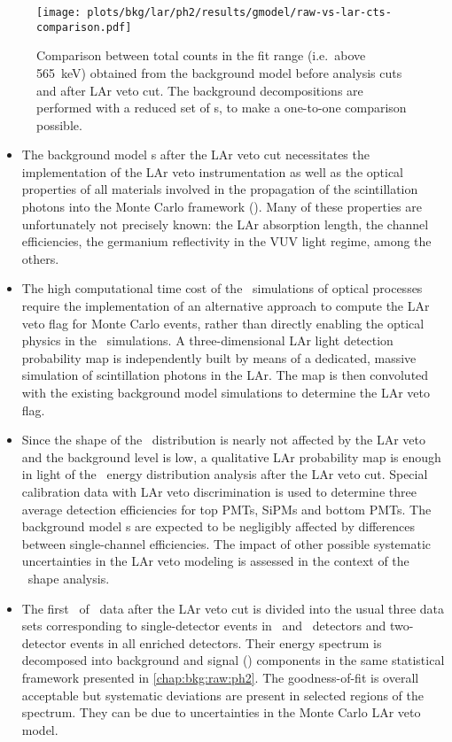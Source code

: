 \begin{figure}
  \centering
  \texttt{[image: plots/bkg/lar/ph2/results/gmodel/raw-vs-lar-cts-comparison.pdf]}
  \caption{%
    Comparison between total counts in the fit range (i.e.~above 565~keV) obtained from
    the background model before analysis cuts and after LAr veto cut. The background
    decompositions are performed with a reduced set of \pdf{}s, to make a one-to-one
    comparison possible.
  }\label{fig:bkg:lar:ph2:cts-comparison}
\end{figure}

\chapsummary
\begin{itemize}
  \item The background model \pdf{}s after the LAr veto cut necessitates the implementation
    of the LAr veto instrumentation as well as the optical properties of all materials
    involved in the propagation of the scintillation photons into the Monte Carlo
    framework (\mage). Many of these properties are unfortunately not precisely known: the
    LAr absorption length, the channel efficiencies, the germanium reflectivity in the VUV
    light regime, among the others.
  \item The high computational time cost of the \geant\ simulations of optical processes
    require the implementation of an alternative approach to compute the LAr veto flag for
    Monte Carlo events, rather than directly enabling the optical physics in the \mage\
    simulations. A three-dimensional LAr light detection probability map is independently
    built by means of a dedicated, massive simulation of scintillation photons in the LAr.
    The map is then convoluted with the existing background model simulations to determine
    the LAr veto flag.
  \item Since the shape of the \nnbb\ distribution is nearly not affected by the LAr veto
    and the background level is low, a qualitative LAr probability map is enough in light
    of the \nnbb\ energy distribution analysis after the LAr veto cut. Special calibration
    data with LAr veto discrimination is used to determine three average detection
    efficiencies for top PMTs, SiPMs and bottom PMTs. The background model \pdf{}s are
    expected to be negligibly affected by differences between single-channel efficiencies.
    The impact of other possible systematic uncertainties in the LAr veto modeling is
    assessed in the context of the \nnbb\ shape analysis.
  \item The first \gexpophasetwobkg\ of \phasetwo\ data after the LAr veto cut is divided
    into the usual three data sets corresponding to single-detector events in \bege\ and
    \scoax\ detectors and two-detector events in all enriched detectors. Their energy
    spectrum is decomposed into background and signal (\nnbb) components in the same
    statistical framework presented in \cref{chap:bkg:raw:ph2}. The goodness-of-fit is
    overall acceptable but systematic deviations are present in selected regions of the
    spectrum. They can be due to uncertainties in the Monte Carlo LAr veto model.
\end{itemize}

